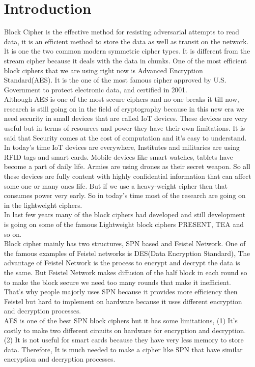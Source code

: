 \documentclass[preprint]{transcrypto}
\begin{document}
\section{Introduction}
Block Cipher is the effective method for resisting adversarial attempts to read data, it is an efficient method to store the data as well as transit on the network. It is one the two common modern symmetric cipher types. It is different from the stream cipher because it deals with the data in chunks. One of the most efficient block ciphers that we are using right now is Advanced Encryption Standard(AES). It is the one of the most famous cipher approved by U.S. Government to protect electronic data, and certified in 2001.\\
Although AES is one of the most secure ciphers and no-one breaks it till now, research is still going on in the field of cryptography because in this new era we need security in small devices that are called IoT devices. These devices are very useful but in terms of resources and power they have their own limitations. It is said that Security comes at the cost of computation and it's easy to understand. In today's time IoT devices are everywhere, Institutes and militaries are using RFID tags and smart cards. Mobile devices like smart watches, tablets have become a part of daily life. Armies are using drones as their secret weapon. So all these devices are fully content with highly confidential information that can affect some one or many ones life. But if we use a heavy-weight cipher then that consumes power very early. So in today's time most of the research are going on in the lightweight ciphers.\\
In last few years many of the block ciphers had developed and still development is going on some of the famous Lightweight block ciphers PRESENT, TEA and so on.\\
Block cipher mainly has two structures, SPN based and Feistel Network. One of the famous examples of Feistel networks is DES(Data Encryption Standard), The advantage of Feistel Network is the process to encrypt and decrypt the data is the same. But Feistel Network makes diffusion of the half block in each round so to make the block secure we need too many rounds that make it inefficient. That's why people majorly uses SPN because it provides 
more efficiency then Feistel but hard to implement on hardware because it uses different encryption and decryption processes.\\
AES is one of the best SPN block ciphers but it has some limitations, (1) It's costly to make two different circuits on hardware for encryption and decryption. (2) It is not useful for smart cards because they have very less memory to store data. Therefore, It is much needed to make a cipher like SPN that have similar encryption and decryption processes.\\
\end{document}

